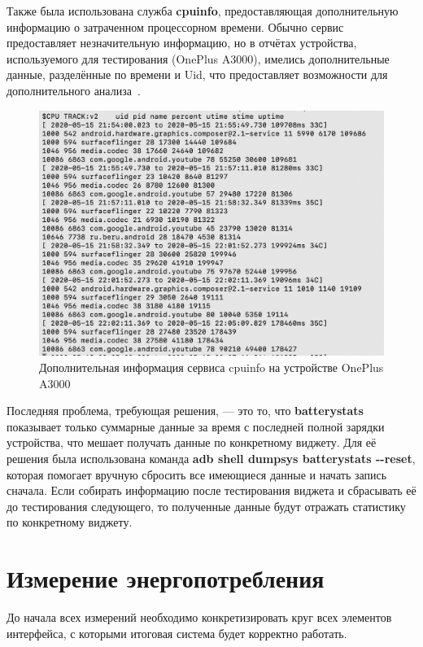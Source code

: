 \documentclass[a4paper,14pt]{extarticle} %
\begin{document}
	Также была использована служба \textbf{cpuinfo}, предоставляющая дополнительную информацию о затраченном процессорном времени. Обычно сервис предоставляет незначительную информацию, но в отчётах устройства, используемого для тестирования (OnePlus A3000), имелись дополнительные данные, разделённые по времени и Uid, что предоставляет возможности для дополнительного анализа~\ris{\ref{fig:cpuinfo}}.
	
	\begin{figure}[H]
		\includegraphics[width=\textwidth]{cpuinfo}
		\caption{Дополнительная информация сервиса cpuinfo на устройстве OnePlus A3000}
		\label{fig:cpuinfo}
	\end{figure}

	Последняя проблема, требующая решения, --- это то, что \textbf{batterystats} показывает только суммарные данные за время с последней полной зарядки устройства, что мешает получать данные по конкретному виджету. Для её решения была использована команда \textbf{adb shell dumpsys batterystats -{}-reset}, которая помогает вручную сбросить все имеющиеся данные и начать запись сначала. Если собирать информацию после тестирования виджета и сбрасывать её до тестирования следующего, то полученные данные будут отражать статистику по конкретному виджету.
	
	\newpage
	\section{Измерение энергопотребления}
	
	До начала всех измерений необходимо конкретизировать круг всех элементов интерфейса, с которыми итоговая система будет корректно работать.
	
\end{document}
